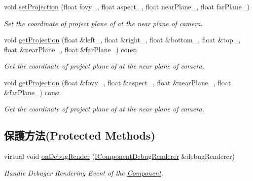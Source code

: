 \begin{DoxyCompactItemize}
void \hyperlink{class_i_dream_sky_1_1_perspective_camera_component_a4a3cc80a282ec870cb1343952b391940}{set\+Projection} (float fovy\+\_\+, float aspect\+\_\+, float near\+Plane\+\_\+, float far\+Plane\+\_\+)
\begin{DoxyCompactList}\small\item\em Set the coordinate of project plane of at the near plane of camera. \end{DoxyCompactList}\item 
void \hyperlink{class_i_dream_sky_1_1_perspective_camera_component_ae3ce00b7bbf1c9e9e073f28793dd1645}{get\+Projection} (float \&left\+\_\+, float \&right\+\_\+, float \&bottom\+\_\+, float \&top\+\_\+, float \&near\+Plane\+\_\+, float \&far\+Plane\+\_\+) const 
\begin{DoxyCompactList}\small\item\em Get the coordinate of project plane of at the near plane of camera. \end{DoxyCompactList}\item 
void \hyperlink{class_i_dream_sky_1_1_perspective_camera_component_a29352b75b672da73782d19fcc2e7b382}{get\+Projection} (float \&fovy\+\_\+, float \&aspect\+\_\+, float \&near\+Plane\+\_\+, float \&far\+Plane\+\_\+) const 
\begin{DoxyCompactList}\small\item\em Get the coordinate of project plane of at the near plane of camera. \end{DoxyCompactList}\end{DoxyCompactItemize}
\subsection*{保護方法(Protected Methods)}
\begin{DoxyCompactItemize}
\item 
virtual void \hyperlink{class_i_dream_sky_1_1_perspective_camera_component_a83b864b187b8b5244eb9d23eeef02b5c}{on\+Debug\+Render} (\hyperlink{class_i_dream_sky_1_1_i_component_debug_renderer}{I\+Component\+Debug\+Renderer} \&debug\+Renderer)\hypertarget{class_i_dream_sky_1_1_perspective_camera_component_a83b864b187b8b5244eb9d23eeef02b5c}{}\label{class_i_dream_sky_1_1_perspective_camera_component_a83b864b187b8b5244eb9d23eeef02b5c}

\begin{DoxyCompactList}\small\item\em Handle Debuger Rendering Event of the \hyperlink{class_i_dream_sky_1_1_component}{Component}. \end{DoxyCompactList}\end{DoxyCompactItemize}
